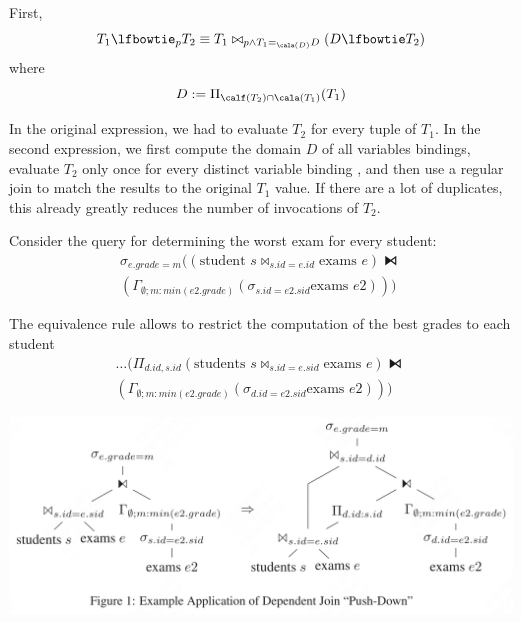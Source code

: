 \documentclass[11pt]{article}
\begin{document}
First,
\begin{equation*}
T_1\lfbowtie_pT_2\equiv T_1\bowtie_{p\wedge T_1=_{\cala(D)}D}(D\lfbowtie T_2)
\end{equation*}
where
\begin{equation*}
D:=\Pi_{\calf(T_2)\cap\cala(T_1)}(T_1)
\end{equation*}

In the original expression, we had to evaluate \(T_2\) for every tuple of \(T_1\). In the second
expression, we first compute the domain \(D\) of all variables bindings, evaluate \(T_2\) only once
for every distinct variable binding , and then use a regular join to match the results to the original
\(T_1\) value. If there are a lot of duplicates, this already greatly reduces the number of
invocations of \(T_2\).

Consider the query for determining the worst exam for every student:
\begin{gather*}
\sigma_{e.grade=m}((\text{student }s\bowtie_{s.id=e.id}\text{exams }e)\lfbowtie\\
(\Gamma_{\emptyset;m:min(e2.grade)}(\sigma_{s.id=e2.sid}\text{exams }e2)))
\end{gather*}

The equivalence rule allows to restrict the computation of the best grades to each student
\begin{gather*}
\dots(\Pi_{d.id,s.id}(\text{students }s\bowtie_{s.id=e.sid}\text{exams }e)\lfbowtie\\
(\Gamma_{\emptyset;m:min(e2.grade)}(\sigma_{d.id=e2.sid}\text{exams }e2)))
\end{gather*}

\begin{center}
\includegraphics[width=.8\textwidth]{../../images/papers/53.png}
\label{}
\end{center}
\end{document}
